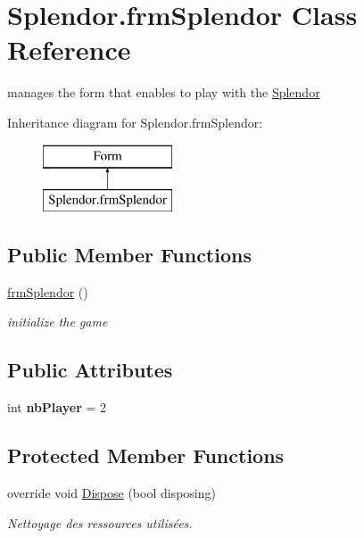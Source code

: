 \hypertarget{class_splendor_1_1frm_splendor}{}\section{Splendor.\+frm\+Splendor Class Reference}
\label{class_splendor_1_1frm_splendor}


manages the form that enables to play with the \mbox{\hyperlink{namespace_splendor}{Splendor}}  


Inheritance diagram for Splendor.\+frm\+Splendor\+:\begin{figure}[H]
\begin{center}
\leavevmode
\includegraphics[height=2.000000cm]{class_splendor_1_1frm_splendor}
\end{center}
\end{figure}
\subsection*{Public Member Functions}
\begin{DoxyCompactItemize}
\item 
\mbox{\hyperlink{class_splendor_1_1frm_splendor_ad9c938893d23192acb1996053e3ea87b}{frm\+Splendor}} ()
\begin{DoxyCompactList}\small\item\em initialize the game \end{DoxyCompactList}\end{DoxyCompactItemize}
\subsection*{Public Attributes}
\begin{DoxyCompactItemize}
\item 
\mbox{\label{class_splendor_1_1frm_splendor_a2d8f5bc8e919f7f6c8bfeacc6360f3af}} 
int {\bfseries nb\+Player} = 2
\end{DoxyCompactItemize}
\subsection*{Protected Member Functions}
\begin{DoxyCompactItemize}
\item 
override void \mbox{\hyperlink{class_splendor_1_1frm_splendor_a749f4f1d67c78e74aa1a55aa6fdd754b}{Dispose}} (bool disposing)
\begin{DoxyCompactList}\small\item\em Nettoyage des ressources utilisées. \end{DoxyCompactList}\end{DoxyCompactItemize}


